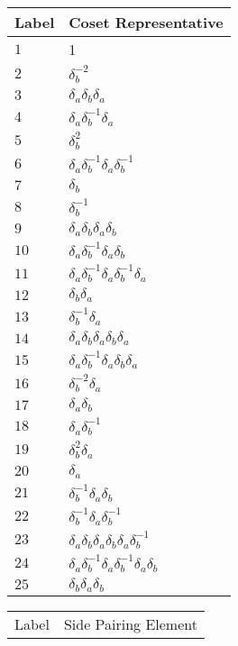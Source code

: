 \documentclass{article}
\begin{document}

\begin{center}
\begin{tabular}{ll}
\toprule
Label & Coset Representative\\
\midrule
$1$ & 1 \\
$2$ & $\delta_b^{-2}$ \\
$3$ & $\delta_a^{}\delta_b^{}\delta_a^{}$ \\
$4$ & $\delta_a^{}\delta_b^{-1}\delta_a^{}$ \\
$5$ & $\delta_b^{2}$ \\
$6$ & $\delta_a^{}\delta_b^{-1}\delta_a^{}\delta_b^{-1}$ \\
$7$ & $\delta_b^{}$ \\
$8$ & $\delta_b^{-1}$ \\
$9$ & $\delta_a^{}\delta_b^{}\delta_a^{}\delta_b^{}$ \\
$10$ & $\delta_a^{}\delta_b^{-1}\delta_a^{}\delta_b^{}$ \\
$11$ & $\delta_a^{}\delta_b^{-1}\delta_a^{}\delta_b^{-1}\delta_a^{}$ \\
$12$ & $\delta_b^{}\delta_a^{}$ \\
$13$ & $\delta_b^{-1}\delta_a^{}$ \\
$14$ & $\delta_a^{}\delta_b^{}\delta_a^{}\delta_b^{}\delta_a^{}$ \\
$15$ & $\delta_a^{}\delta_b^{-1}\delta_a^{}\delta_b^{}\delta_a^{}$ \\
$16$ & $\delta_b^{-2}\delta_a^{}$ \\
$17$ & $\delta_a^{}\delta_b^{}$ \\
$18$ & $\delta_a^{}\delta_b^{-1}$ \\
$19$ & $\delta_b^{2}\delta_a^{}$ \\
$20$ & $\delta_a^{}$ \\
$21$ & $\delta_b^{-1}\delta_a^{}\delta_b^{}$ \\
$22$ & $\delta_b^{-1}\delta_a^{}\delta_b^{-1}$ \\
$23$ & $\delta_a^{}\delta_b^{}\delta_a^{}\delta_b^{}\delta_a^{}\delta_b^{-1}$ \\
$24$ & $\delta_a^{}\delta_b^{-1}\delta_a^{}\delta_b^{-1}\delta_a^{}\delta_b^{}$ 
\\
$25$ & $\delta_b^{}\delta_a^{}\delta_b^{}$ \\
\bottomrule
\end{tabular}
\hfill
\begin{tabular}{ll}
\toprule
Label & Side Pairing Element\\

\end{tabular}
\end{center}
\end{document}

